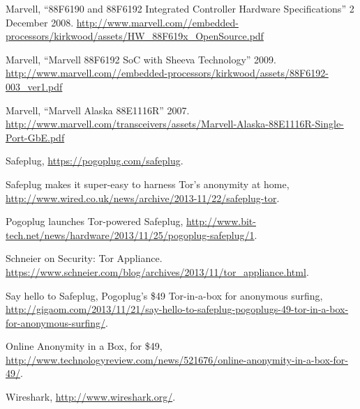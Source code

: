 \begin{thebibliography}{99}

 Marvell, ``88F6190 and 88F6192 Integrated Controller Hardware Specifications'' 2 December 2008. \url{http://www.marvell.com//embedded-processors/kirkwood/assets/HW_88F619x_OpenSource.pdf}

 Marvell, ``Marvell 88F6192 SoC with Sheeva Technology'' 2009. \url{http://www.marvell.com//embedded-processors/kirkwood/assets/88F6192-003_ver1.pdf}

 Marvell, ``Marvell Alaska 88E1116R'' 2007. \url{http://www.marvell.com/transceivers/assets/Marvell-Alaska-88E1116R-Single-Port-GbE.pdf}

 Safeplug, \url{https://pogoplug.com/safeplug}.

 Safeplug makes it super-easy to harness Tor's anonymity at home, \url{http://www.wired.co.uk/news/archive/2013-11/22/safeplug-tor}.

 Pogoplug launches Tor-powered Safeplug, \url{http://www.bit-tech.net/news/hardware/2013/11/25/pogoplug-safeplug/1}.

 Schneier on Security: Tor Appliance.  \url{https://www.schneier.com/blog/archives/2013/11/tor_appliance.html}.

 Say hello to Safeplug, Pogoplug’s \$49 Tor-in-a-box for anonymous surfing, \url{http://gigaom.com/2013/11/21/say-hello-to-safeplug-pogoplugs-49-tor-in-a-box-for-anonymous-surfing/}.

 Online Anonymity in a Box, for \$49, \url{http://www.technologyreview.com/news/521676/online-anonymity-in-a-box-for-49/}.

 Wireshark, \url{http://www.wireshark.org/}. 

\end{thebibliography}
